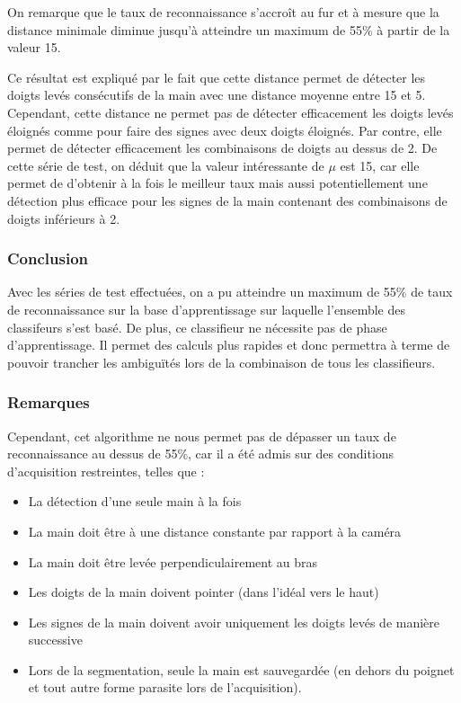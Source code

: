 On remarque que le taux de reconnaissance s’accroît au fur et à mesure que la distance minimale diminue jusqu’à atteindre un maximum de 55\% à partir de la valeur 15. 

Ce résultat est expliqué par le fait que cette distance permet de détecter les doigts levés consécutifs de la main avec une distance moyenne entre 15 et 5. Cependant, cette distance ne permet pas de détecter efficacement les doigts levés éloignés comme pour faire des signes avec deux doigts éloignés. Par contre, elle permet de détecter efficacement les combinaisons de doigts au dessus de 2. 
De cette série de test, on déduit que la valeur intéressante de $\mu$ est 15, car elle permet de d’obtenir à la fois le meilleur taux mais aussi potentiellement une détection plus efficace pour les signes de la main contenant des combinaisons de doigts inférieurs à 2.

\subsubsection{Conclusion}
Avec les séries de test effectuées, on a pu atteindre un maximum de 55\% de taux de reconnaissance sur la base d’apprentissage sur laquelle l'ensemble des classifeurs s'est basé. De plus, ce classifieur ne nécessite pas de phase d’apprentissage. Il permet des calculs plus rapides et donc permettra à terme de pouvoir trancher les ambiguïtés lors de la combinaison de tous les classifieurs.

\subsubsection{Remarques}
Cependant, cet algorithme ne nous permet pas de dépasser un taux de reconnaissance au dessus de 55\%, car il a été admis sur des conditions d’acquisition restreintes, telles que :
\begin{itemize}
\item La détection d’une seule main à la fois
\item La main doit être à une distance constante par rapport à la caméra
\item La main doit être levée perpendiculairement au bras
\item Les doigts de la main doivent pointer (dans l’idéal vers le haut)
\item Les signes de la main doivent avoir uniquement les doigts levés de manière successive
\item Lors de la segmentation, seule la main est sauvegardée (en dehors du poignet et tout autre forme parasite lors de l'acquisition).
\end{itemize}